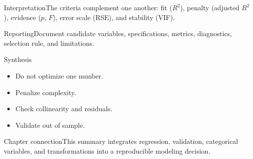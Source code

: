 \documentclass[10pt,aspectratio=169]{beamer}
\begin{document}
\begin{frame}{Interpretation}\small The criteria complement one another: fit ($R^2$), penalty (adjusted $R^2$), evidence ($p$, $F$), error scale (RSE), and stability (VIF).\end{frame}
\begin{frame}{Reporting}\small Document candidate variables, specifications, metrics, diagnostics, selection rule, and limitations.\end{frame}
\begin{frame}{Synthesis}\small\begin{itemize}\item Do not optimize one number.\item Penalize complexity.\item Check collinearity and residuals.\item Validate out of sample.\end{itemize}\end{frame}
\begin{frame}{Chapter connection}\small This summary integrates regression, validation, categorical variables, and transformations into a reproducible modeling decision.\end{frame}
\end{document}
